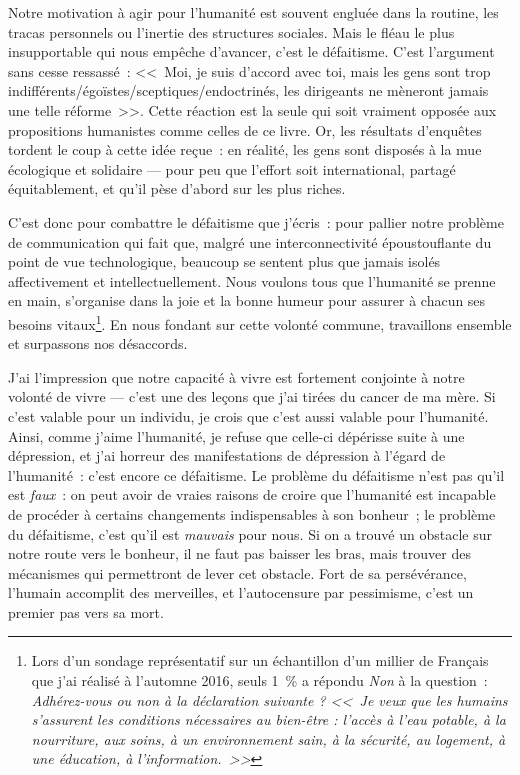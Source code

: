 \documentclass[a5paper,french]{memoir}
\begin{document}
Notre motivation à agir pour l'humanité est souvent engluée dans la routine, les tracas personnels ou l'inertie des structures sociales. %
Mais le fléau le plus insupportable qui nous empêche d'avancer, c'est le défaitisme. C'est l'argument sans cesse ressassé~: <<~Moi, je suis d'accord avec toi, mais les gens sont trop indifférents/égoïstes/sceptiques/endoctrinés, les dirigeants ne mèneront jamais une telle réforme~>>. Cette réaction est la seule qui soit vraiment opposée aux propositions humanistes comme celles de ce livre. %
Or, les résultats d'enquêtes tordent le coup à cette idée reçue~: en réalité, les gens sont disposés à la mue écologique et solidaire --- pour peu que l'effort soit international, partagé équitablement, et qu'il pèse d'abord sur les plus riches.

C'est donc pour combattre le défaitisme 
que j'écris~: pour pallier notre problème de communication qui fait que, malgré une interconnectivité époustouflante %
du point de vue technologique, beaucoup se sentent plus que jamais isolés affectivement et intellectuellement. Nous voulons tous que l'humanité se prenne en main, s'organise 
dans la joie et la bonne humeur 
pour assurer à chacun ses besoins vitaux\footnote{Lors d'un sondage représentatif sur un échantillon d'un millier de Français que j'ai réalisé à l'automne 2016, seuls 1~\% a répondu \textit{Non} à la question~: \textit{Adhérez-vous ou non à la déclaration suivante ? <<~Je veux que les humains s'assurent les conditions nécessaires au bien-être : l'accès à l'eau potable, à la nourriture, aux soins, à un environnement sain, à la sécurité, au logement, à une éducation, à l'information.~>>}}. 
En nous fondant sur cette volonté commune, travaillons ensemble et surpassons nos désaccords.

J'ai l'impression que notre capacité à vivre est fortement conjointe à notre volonté de vivre --- c'est une des leçons que j'ai tirées du cancer de ma mère. Si c'est valable pour un individu, je crois que c'est aussi valable pour l'humanité. Ainsi, comme j'aime l'humanité, je refuse que celle-ci dépérisse suite à une dépression, et j'ai horreur des manifestations de dépression à l'égard de l'humanité~: c'est encore ce défaitisme. %
Le problème du défaitisme n'est pas qu'il est \textit{faux}~: on peut avoir de vraies raisons de croire que l'humanité est %
incapable de procéder à certains changements indispensables à son bonheur~; le problème du défaitisme, c'est qu'il est \textit{mauvais} pour nous. Si on a trouvé un obstacle sur notre route vers le bonheur, il ne faut pas baisser les bras, mais trouver des mécanismes qui permettront de lever cet obstacle. Fort de sa persévérance, l'humain accomplit des merveilles, et l'autocensure par pessimisme, c'est un premier pas vers sa mort. 
\end{document}

